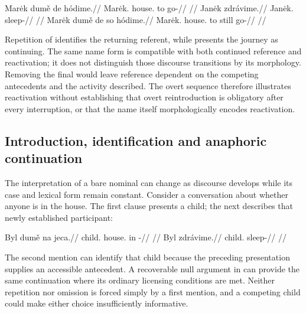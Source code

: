 \pex\label{ex:disc-reactivation}
\a
\begingl
\gla Marėk dumě de hódime.//
\glb Marėk.\Dir{} house.\Ind{} to go-\Prog{}//
\glft {} //
\endgl
\a
\begingl
\gla Janėk zdrávime.//
\glb Janėk.\Dir{} sleep-\Prog{}//
\glft {} //
\endgl
\a
\begingl
\gla Marėk dumě de so hódime.//
\glb Marėk.\Dir{} house.\Ind{} to still go-\Prog{}//
\glft {} //
\endgl
\xe

\noindent Repetition of  identifies the returning referent, while
  presents the journey as continuing. The same name form is compatible
 with both continued reference and reactivation; it does not distinguish those
 discourse transitions by its morphology. Removing the final 
 would leave reference dependent on the competing antecedents and the activity described.
 The overt sequence therefore illustrates reactivation without establishing
 that overt reintroduction is obligatory after every interruption, or that
 the name itself morphologically encodes reactivation.

\subsection{Introduction, identification and anaphoric continuation}
\label{sec:disc-anchoring-controlled}

The interpretation of a bare nominal can change as discourse develops while
 its case and lexical form remain constant. Consider a conversation about
 whether anyone is in the house. The first clause presents a child; the next
 describes that newly established participant:

\pex\label{ex:disc-anchoring-controlled}
\a
\begingl
\gla Byl dumě na jeca.//
\glb child.\Dir{} house.\Ind{} in \Exst{}-\Cont{}//
\glft {}
//
\endgl
\a
\begingl
\gla Byl zdrávime.//
\glb child.\Dir{} sleep-\Prog{}//
\glft {}
//
\endgl
\xe

\noindent The second mention can identify that child because the preceding
 presentation supplies an accessible antecedent. A recoverable null argument
 in  can provide the same continuation where its ordinary
 licensing conditions are met. Neither repetition nor omission is forced
 simply by a first mention, and a competing child could make either choice
 insufficiently informative.

